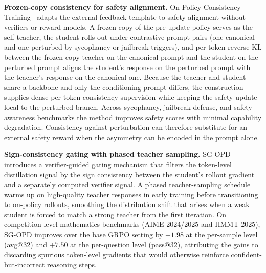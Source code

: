 \documentclass{article} %
\begin{document}
\textbf{Frozen-copy consistency for safety alignment.} On-Policy Consistency Training~\citep{2605.21834} adapts the external-feedback template to safety alignment without verifiers or reward models. A frozen copy of the pre-update policy serves as the self-teacher, the student rolls out under contrastive prompt pairs (one canonical and one perturbed by sycophancy or jailbreak triggers), and per-token reverse KL between the frozen-copy teacher on the canonical prompt and the student on the perturbed prompt aligns the student's response on the perturbed prompt with the teacher's response on the canonical one. Because the teacher and student share a backbone and only the conditioning prompt differs, the construction supplies dense per-token consistency supervision while keeping the safety update local to the perturbed branch. Across sycophancy, jailbreak-defense, and safety-awareness benchmarks the method improves safety scores with minimal capability degradation. Consistency-against-perturbation can therefore substitute for an external safety reward when the asymmetry can be encoded in the prompt alone.

\textbf{Sign-consistency gating with phased teacher sampling.} SG-OPD~\citep{2606.09304} introduces a verifier-guided gating mechanism that filters the token-level distillation signal by the sign consistency between the student's rollout gradient and a separately computed verifier signal. A phased teacher-sampling schedule warms up on high-quality teacher responses in early training before transitioning to on-policy rollouts, smoothing the distribution shift that arises when a weak student is forced to match a strong teacher from the first iteration. On competition-level mathematics benchmarks (AIME 2024/2025 and HMMT 2025), SG-OPD improves over the base GRPO setting by $+1.98$ at the per-sample level (avg@32) and $+7.50$ at the per-question level (pass@32), attributing the gains to discarding spurious token-level gradients that would otherwise reinforce confident-but-incorrect reasoning steps.
\end{document}
